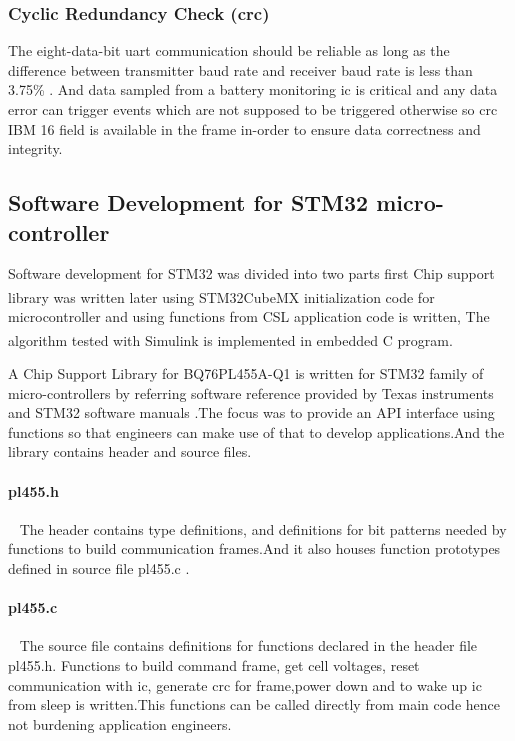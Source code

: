 \subsubsection{Cyclic Redundancy Check (\acrshort{crc})}
The eight-data-bit \acrshort{uart} communication should be reliable as long as the difference between transmitter baud rate and receiver baud rate is less than 3.75\% \cite{uartrel}. And data sampled from a battery monitoring \acrshort{ic} is critical and any data error can trigger events which are not supposed to be triggered otherwise so \acrshort{crc} IBM 16 field is available in the frame in-order to ensure data correctness and integrity.

\subsection{Software Development for STM32 micro-controller}
Software development for STM32 was divided into two parts first Chip support library was written later using STM32CubeMX\textsuperscript{\textregistered} initialization code for microcontroller and using functions from CSL application code is written, The algorithm tested with Simulink\textsuperscript{\textregistered} is implemented in embedded C program.

A  Chip Support  Library for BQ76PL455A-Q1 is written for STM32 family of micro-controllers by referring software reference provided by Texas instruments \cite{ti:pl455example} and STM32 software manuals \cite{stm:halmanual}.The focus was to provide an API interface using functions so that engineers can make use of that to develop applications.And the library contains header and source files.

\paragraph{pl455.h} ~\linebreak
The header contains type definitions, and definitions for bit patterns needed by functions to build communication frames.And it also houses function prototypes defined in source file pl455.c . 


 
\paragraph{pl455.c} ~\linebreak
The source file contains definitions for functions declared in the header file pl455.h. Functions to build command frame, get cell voltages, reset communication with \acrshort{ic}, generate \acrshort{crc} for frame,power down and to wake up \acrshort{ic} from sleep is written.This functions can be called directly from main code hence not burdening application engineers.

